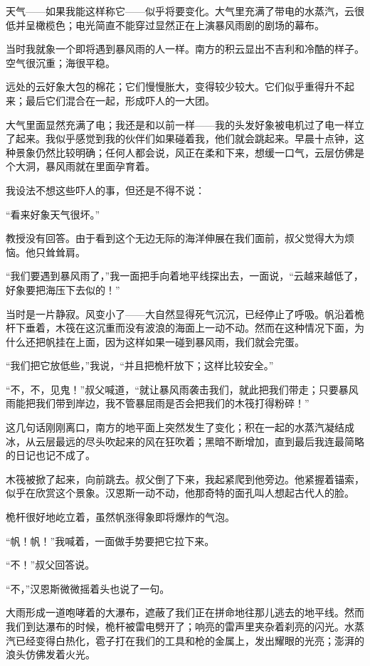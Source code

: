 \documentclass[10pt]{book}
\begin{document}
天气——如果我能这样称它——似乎将要变化。大气里充满了带电的水蒸汽，云很低并呈橄榄色；电光简直不能穿过显然正在上演暴风雨剧的剧场的幕布。

当时我就象一个即将遇到暴风雨的人一样。南方的积云显出不吉利和冷酷的样子。空气很沉重；海很平稳。

远处的云好象大包的棉花；它们慢慢胀大，变得较少较大。它们似乎重得升不起来；最后它们混合在一起，形成吓人的一大团。

大气里面显然充满了电；我还是和以前一样——我的头发好象被电机过了电一样立了起来。我似乎感觉到我的伙伴们如果碰着我，他们就会跳起来。早晨十点钟，这种景象仍然比较明确；任何人都会说，风正在柔和下来，想缓一口气，云层仿佛是个大洞，暴风雨就在里面孕育着。

我设法不想这些吓人的事，但还是不得不说：

“看来好象天气很坏。”

教授没有回答。由于看到这个无边无际的海洋伸展在我们面前，叔父觉得大为烦恼。他只耸耸肩。

“我们要遇到暴风雨了，”我一面把手向着地平线探出去，一面说，“云越来越低了，好象要把海压下去似的！”

当时是一片静寂。风变小了——大自然显得死气沉沉，已经停止了呼吸。帆沿着桅杆下垂着，木筏在这沉重而没有波浪的海面上一动不动。然而在这种情况下面，为什么还把帆挂在上面，因为这样如果一碰到暴风雨，我们就会完蛋。

“我们把它放低些，”我说，“并且把桅杆放下；这样比较安全。”

“不，不，见鬼！”叔父喊道，“就让暴风雨袭击我们，就此把我们带走；只要暴风雨能把我们带到岸边，我不管暴屈雨是否会把我们的木筏打得粉碎！”

这几句话刚刚离口，南方的地平面上突然发生了变化；积在一起的水蒸汽凝结成冰，从云层最远的尽头吹起来的风在狂吹着；黑暗不断增加，直到最后我连最简略的日记也记不成了。

木筏被掀了起来，向前跳去。叔父倒了下来，我起紧爬到他旁边。他紧握着锚索，似乎在欣赏这个景象。汉恩斯一动不动，他那奇特的面孔叫人想起古代人的脸。

桅杆很好地屹立着，虽然帆涨得象即将爆炸的气泡。

“帆！帆！”我喊着，一面做手势要把它拉下来。

“不！”叔父回答说。

“不，”汉恩斯微微摇着头也说了一句。

大雨形成一道咆哮着的大瀑布，遮蔽了我们正在拼命地往那儿逃去的地平线。然而我们到达瀑布的时候，桅杆被雷电劈开了；响亮的雷声里夹杂着刹亮的闪光。水蒸汽已经变得白热化，雹子打在我们的工具和枪的金属上，发出耀眼的光亮；澎湃的浪头仿佛发着火光。
\end{document}
